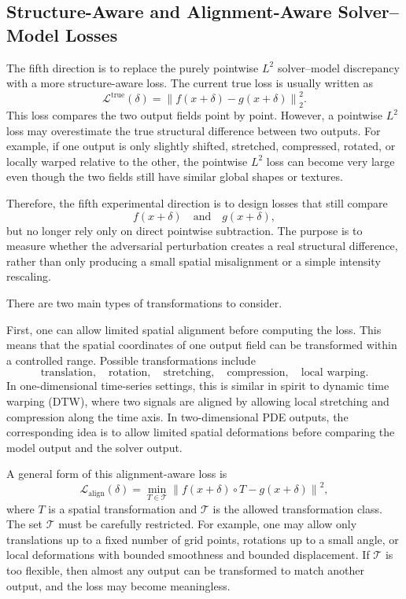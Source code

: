\documentclass{article}
\begin{document}
\subsection{Structure-Aware and Alignment-Aware Solver--Model Losses}

The fifth direction is to replace the purely pointwise \(L^2\) solver--model discrepancy with a more structure-aware loss. The current true loss is usually written as
\[
\mathcal{L}^{\mathrm{true}}(\delta)
=
\left\|
f(x+\delta)-g(x+\delta)
\right\|_2^2.
\]
This loss compares the two output fields point by point. However, a pointwise \(L^2\) loss may overestimate the true structural difference between two outputs. For example, if one output is only slightly shifted, stretched, compressed, rotated, or locally warped relative to the other, the pointwise \(L^2\) loss can become very large even though the two fields still have similar global shapes or textures.

Therefore, the fifth experimental direction is to design losses that still compare
\[
f(x+\delta)
\quad\text{and}\quad
g(x+\delta),
\]
but no longer rely only on direct pointwise subtraction. The purpose is to measure whether the adversarial perturbation creates a real structural difference, rather than only producing a small spatial misalignment or a simple intensity rescaling.

There are two main types of transformations to consider.

First, one can allow limited spatial alignment before computing the loss. This means that the spatial coordinates of one output field can be transformed within a controlled range. Possible transformations include
\[
\text{translation},\quad
\text{rotation},\quad
\text{stretching},\quad
\text{compression},\quad
\text{local warping}.
\]
In one-dimensional time-series settings, this is similar in spirit to dynamic time warping (DTW), where two signals are aligned by allowing local stretching and compression along the time axis. In two-dimensional PDE outputs, the corresponding idea is to allow limited spatial deformations before comparing the model output and the solver output.

A general form of this alignment-aware loss is
\[
\mathcal{L}_{\mathrm{align}}(\delta)
=
\min_{T \in \mathcal{T}}
\left\|
f(x+\delta)\circ T
-
g(x+\delta)
\right\|^2,
\]
where \(T\) is a spatial transformation and \(\mathcal{T}\) is the allowed transformation class. The set \(\mathcal{T}\) must be carefully restricted. For example, one may allow only translations up to a fixed number of grid points, rotations up to a small angle, or local deformations with bounded smoothness and bounded displacement. If \(\mathcal{T}\) is too flexible, then almost any output can be transformed to match another output, and the loss may become meaningless.
\end{document}
